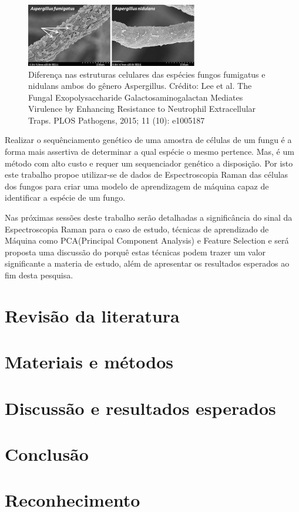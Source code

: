 \documentclass[conference,peerreview]{IEEEtran}
\begin{document}
\begin{figure}[ht]
\centering
\includegraphics[width=7.5cm]{fungus_dif}
\caption{Diferença nas estruturas celulares das espécies fungos fumigatus e nidulans ambos do gênero Aspergillus. Crédito: Lee et al. The Fungal Exopolysaccharide Galactosaminogalactan Mediates Virulence by Enhancing Resistance to Neutrophil Extracellular Traps. PLOS Pathogens, 2015; 11 (10): e1005187}
\label{fg_exemp1}
\end{figure}

Realizar o sequênciamento genético de uma amostra de células de um fungu é a forma mais assertiva de determinar a qual espécie o mesmo pertence. Mas, é um método com alto custo e requer um sequenciador genético a disposição. Por isto este trabalho propoe utilizar-se de dados de Espectroscopia Raman das células dos fungos para criar uma modelo de aprendizagem de máquina capaz de identificar a espécie de um fungo.

Nas próximas sessões deste trabalho serão detalhadas a significância do sinal da Espectroscopia Raman para o caso de estudo, técnicas de aprendizado de Máquina como PCA(Principal Component Analysis) e Feature Selection e será proposta uma discussão do porquê estas técnicas podem trazer um valor significante a materia de estudo, além de apresentar os resultados esperados ao fim desta pesquisa.

\section{Revisão da literatura}

\section{Materiais e métodos}

\section{Discussão e resultados esperados}
\section{Conclusão}


\section*{Reconhecimento}



\end{document}
